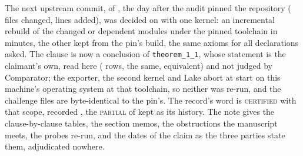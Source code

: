 \documentclass[preprint,11pt,authoryear,a4paper]{elsarticle}
\newcommand{\vword}[1]{{\normalfont\scshape #1}}
\newcommand{\vC}{\vword{certified}}
\newcommand{\vP}{\vword{partial}}
\newcommand{\lean}[1]{\texttt{#1}}
\begin{document}
The next upstream commit, \NsHeadCommit{} of \NsHeadDate, the day after the audit pinned the repository (\MtNsUpstreamFiles{} files changed, \MtNsUpstreamInsertions{} lines added), was decided on \MtNsUpstreamChecked{} with one kernel: an incremental rebuild of the \MtNsHeadRebuilt{} changed or dependent modules under the pinned toolchain in \MtNsHeadMinutes{} minutes, the other \MtNsHeadReused{} kept from the pin's build, the same axioms for all \UpAxiomDecls{} declarations asked. The clause is now a conclusion of \lean{theorem\_1\_1}, whose statement is the claimant's own, read here (\UpFidRows{} rows, \UpFidSame{} the same, \UpFidEquivalent{} equivalent) and not judged by Comparator; the exporter, the second kernel and Lake abort at start on this machine's operating system at that toolchain, so neither was re-run, and the challenge files are byte-identical to the pin's. The record's word is \vC{} with that scope, recorded \NsRecorded, the \vP{} of \NsPriorRecorded{} kept as its history. The note \citep[the Navier--Stokes note]{CMArchive} gives the clause-by-clause tables, the \SectionMemos{} section memos, the obstructions the manuscript meets, the probes re-run, and the \DateRowsCount{} dates of the claim as the three parties state them, adjudicated nowhere.
\end{document}
